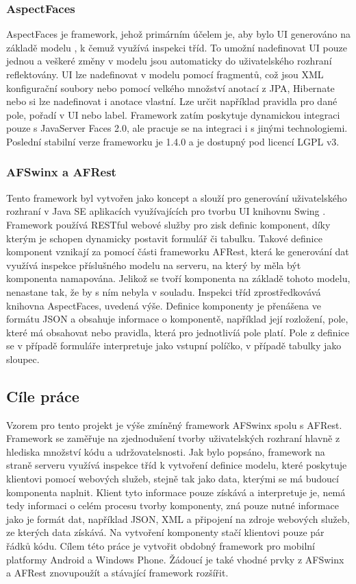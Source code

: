 \subsubsection{AspectFaces}
AspectFaces je framework, jehož primárním účelem je, aby bylo UI generováno na základě modelu \cite{aspectdriven}, k čemuž využívá inspekci tříd. To umožní nadefinovat UI pouze jednou a veškeré změny v modelu jsou automaticky do uživatelského rozhraní reflektovány. UI lze nadefinovat v modelu pomocí fragmentů, což jsou XML konfigurační soubory nebo pomocí velkého množství anotací z JPA, Hibernate nebo si lze nadefinovat i anotace vlastní. Lze určit například pravidla pro dané pole, pořadí v UI nebo label. Framework zatím poskytuje dynamickou integraci pouze s JavaServer Faces 2.0, ale pracuje se na integraci i s jinými technologiemi. Poslední stabilní verze frameworku je 1.4.0 a je dostupný pod licencí LGPL v3.

\subsubsection{AFSwinx a AFRest}
Tento framework byl vytvořen jako koncept a slouží pro generování uživatelského rozhraní v Java SE aplikacích využívajících pro tvorbu UI knihovnu Swing \cite{tomasek-thesis}. Framework používá RESTful webové služby pro zisk definic komponent, díky kterým je schopen dynamicky postavit formulář či tabulku. Takové definice komponent vznikají za pomocí části frameworku AFRest, která ke generování dat využívá inspekce příslušného modelu na serveru, na který by měla být komponenta namapována. Jelikož se tvoří komponenta na základě tohoto modelu, nenastane tak, že by s ním nebyla v souladu. Inspekci tříd zprostředkovává knihovna AspectFaces, uvedená výše. Definice komponenty je přenášena ve formátu JSON a obsahuje informace o komponentě, například její rozložení, pole, které má obsahovat nebo pravidla, která pro jednotlivíá pole platí. Pole z definice se v případě formuláře interpretuje jako vstupní políčko, v případě tabulky jako sloupec. 

\subsection{Cíle práce}
Vzorem pro tento projekt je výše zmíněný framework AFSwinx spolu s AFRest\cite{tomasek-thesis}. Framework se zaměřuje na zjednodušení tvorby uživatelských rozhraní hlavně z hlediska množství kódu a udržovatelsnosti. Jak bylo popsáno, framework na straně serveru využívá inspekce tříd k vytvoření definice modelu, které poskytuje klientovi pomocí webových služeb, stejně tak jako data, kterými se má budoucí komponenta naplnit. Klient tyto informace pouze získává a interpretuje je, nemá tedy informaci o celém procesu tvorby komponenty, zná pouze nutné informace jako je formát dat, například JSON, XML a připojení na zdroje webových služeb, ze kterých data získává. Na vytvoření komponenty stačí klientovi pouze pár řádků kódu. Cílem této práce je vytvořit obdobný framework pro mobilní platformy Android a Windows Phone. Žádoucí je také vhodné prvky z AFSwinx a AFRest znovupoužít a stávající framework rozšířit.
